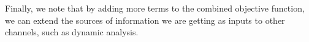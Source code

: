 \documentclass[acmsmall, review, anonymous]{acmart}\settopmatter{printfolios=true,printccs=false,printacmref=false}
\begin{document}
Finally, we note that by adding more terms to the combined objective function, we can 
extend the sources of information we are getting as inputs to other channels, such as dynamic analysis.





\end{document}

